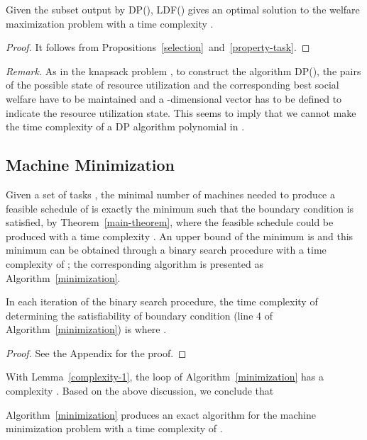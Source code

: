 \documentclass[10pt,journal,compsoc]{IEEEtran}
\begin{document}
\begin{proposition}\label{proposition-DP}
Given the subset  output by DP(), LDF() gives an optimal solution to the welfare maximization problem with a time complexity .
\end{proposition}
\begin{proof}
It follows from Propositions~\ref{selection}~and~\ref{property-task}.
\end{proof}

\noindent\textit{Remark.} As in the knapsack problem \cite{Williamson}, to construct the algorithm DP(), the pairs of the possible state of resource utilization and the corresponding best social welfare have to be maintained and a -dimensional vector has to be defined to indicate the resource utilization state. This seems to imply that we cannot make the time complexity of a DP algorithm polynomial in .


\subsection{Machine Minimization}





Given a set of tasks , the minimal number of machines needed to produce a feasible schedule of  is exactly the minimum  such that the boundary condition is satisfied, by Theorem~\ref{main-theorem}, where the feasible schedule could be produced with a time complexity . An upper bound of the minimum  is  and this minimum  can be obtained through a binary search procedure with a time complexity of ; the corresponding algorithm is presented as Algorithm~\ref{minimization}.

\begin{lemma}\label{complexity-1}
In each iteration of the binary search procedure, the time complexity of determining the satisfiability of boundary condition (line 4 of Algorithm~\ref{minimization}) is  where .
\end{lemma}
\begin{proof}
See the Appendix for the proof. 
\end{proof}

With Lemma~\ref{complexity-1}, the loop of Algorithm~\ref{minimization} has a complexity . Based on the above discussion, we conclude that

\begin{proposition}\label{machine-minimization}
Algorithm~\ref{minimization} produces an exact algorithm for the machine minimization problem with a time complexity of .
\end{proposition}
\end{document}
